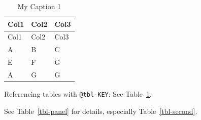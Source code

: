 \documentclass[
  11pt,
  letterpaper,
]{book}
\begin{document}
\begin{longtable}[]{@{}lll@{}}
\caption{My Caption 1}\label{tbl-letters}\tabularnewline
\toprule\noalign{}
Col1 & Col2 & Col3 \\
\midrule\noalign{}
\endfirsthead
\toprule\noalign{}
Col1 & Col2 & Col3 \\
\midrule\noalign{}
\endhead
\bottomrule\noalign{}
\endlastfoot
A & B & C \\
E & F & G \\
A & G & G \\
\end{longtable}

Referencing tables with \texttt{@tbl-KEY}: See Table~\ref{tbl-letters}.

\begin{table}

\caption{\label{tbl-panel}Main Caption}

\begin{minipage}{0.50\linewidth}



\end{minipage}%
%
\begin{minipage}{0.50\linewidth}



\end{minipage}%

\end{table}%

See Table~\ref{tbl-panel} for details, especially
Table~\ref{tbl-second}.
\end{document}
